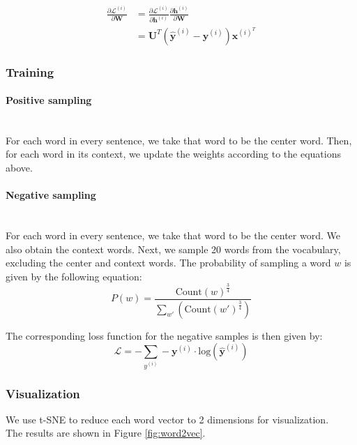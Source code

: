\documentclass{article}
\begin{document}
\begin{equation}
\begin{split}
\frac{\partial \mathcal{L}^{(i)}}{\partial \bm{W}}
	&= \frac{\partial \mathcal{L}^{(i)}}{\partial \bm{h}^{(i)}} \frac{\partial \bm{h}^{(i)}}{\partial \bm{W}} \\
	&= \bm{U}^T(\hat{\bm{y}}^{(i)} - \bm{y}^{(i)}) \bm{x}^{(i)^T}
\end{split}
\end{equation}

\subsubsection{Training}
\paragraph{Positive sampling}\mbox{}\\
For each word in every sentence, we take that word to be the center word. Then, for each word in its context, we update the weights according to the equations above.

\paragraph{Negative sampling}\mbox{}\\
For each word in every sentence, we take that word to be the center word. We also obtain the context words. Next, we sample 20 words from the vocabulary, excluding the center and context words. The probability of sampling a word $w$ is given by the following equation:
	$$ P(w) = \frac{\text{Count}(w)^\frac{3}{4}}{\sum_{w'}(\text{Count}(w')^\frac{3}{4})}  $$
	
The corresponding loss function for the negative samples is then given by:
	$$ \mathcal{L} = -\sum_{y^{(i)}} -\bm{y}^{(i)} \cdot \text{log}(\hat{\bm{y}}^{(i)}) $$

\subsubsection{Visualization}
We use t-SNE to reduce each word vector to 2 dimensions for visualization.\\
The results are shown in Figure \ref{fig:word2vec}.
\end{document}
